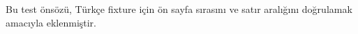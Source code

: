 Bu test önsözü, Türkçe fixture için ön sayfa sırasını ve satır aralığını
doğrulamak amacıyla eklenmiştir.
